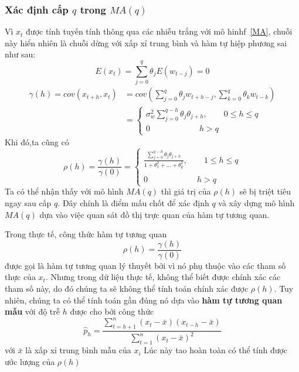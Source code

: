 \documentclass[twoside,12pt]{Latex/Classes/PhDthesisPSnPDF}
\begin{document}
\subsubsection{Xác định cấp $q$ trong $MA(q)$}
Vì $x_t$ được tính tuyến tính thông qua các nhiễu trắng với mô hinhf~\ref{MA}, chuỗi này hiển nhiên là chuỗi dừng với xấp xỉ trung bình và hàm tự hiệp phương sai như sau:
\begin{equation}
	E(x_t) = \sum\limits_{j=0}^{q}\theta_{j}E(w_{t-j})=0
\end{equation}
\begin{align}
	\gamma(h)=cov(x_{t+h},x_t)&= cov(\sum\limits_{j=0}^{q}\theta_jw_{t+h-j},\sum\limits_{k=0}^{q}\theta_kw_{t-k})\\
	&= \begin{cases}
			\sigma_{w}^{2}\sum\limits_{j=0}^{q-h}\theta_j\theta_{j+h}, \qquad 0 \leq h \leq q \\
			0 \qquad\qquad\qquad h > q
		\end{cases}
\end{align}
Khi đó,ta cũng có 
\begin{equation}
	\rho(h) = \frac{\gamma(h)}{\gamma(0)}=
	\begin{cases}
		\frac{\sum\limits_{j=0}^{q-h}\theta_j\theta_{j+h}}{1+\theta_{1}^{2}+...+\theta_{q}^{2}} , \qquad 1 \leq h \leq q \\
		   \\
		0 \qquad\qquad\qquad h >q
	\end{cases}
\end{equation}
Ta có thể nhận thấy với mô hình $MA(q)$ thì giá trị của $\rho(h)$ sẽ bị triệt tiêu ngay sau cấp $q$. Đây chính là điểm mấu chốt để xác định $q$ và xây dựng mô hình $MA(q)$ dựa vào việc quan sát đồ thị trực quan của hàm tự tương quan.

Trong thực tế, công thức hàm tự tương quan 
\begin{equation}
	\rho(h) = \frac{\gamma(h)}{\gamma(0)}
\end{equation}
được gọi là hàm tự tương quan lý thuyết bởi vì nó phụ thuộc vào các tham số thực của $x_t$. Nhưng trong dữ liệu thực tế, không thể biết được chính xác các tham số này, do đó chúng ta sẽ không thể tính toán chính xác được $\rho(h)$. Tuy nhiên, chúng ta có thể tính toán gần đúng nó dựa vào \textbf{hàm tự tương quan mẫu} với độ trễ $h$ được cho bởi công thức
\begin{equation}
	\hat{p}_h = \frac{\sum\limits_{t=h+1}^{n}(x_t-\bar{x})(x_{t-h}-\bar{x})}{\sum\limits_{t=1}^{n}(x_t-\bar{x})^{2}}
\end{equation}
với $\bar{x}$ là xấp xỉ trung bình mẫu của $x_i$
Lúc này tao hoàn toàn có thể tính được ước lượng của $\rho(h)$
\end{document}
